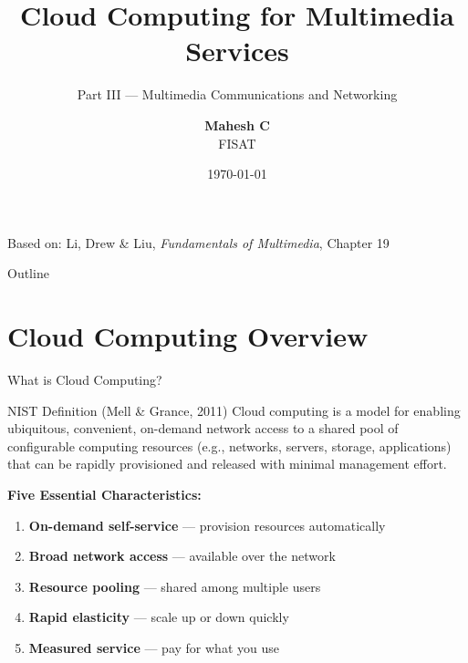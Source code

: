 \documentclass[aspectratio=169,12pt]{beamer}
\title[Cloud Computing for Multimedia]{Cloud Computing for Multimedia Services}
\subtitle{Part III --- Multimedia Communications and Networking}
\author[Mahesh C]{\textbf{Mahesh C}\\FISAT}
\institute{Federal Institute of Science and Technology (FISAT)\\Multimedia Technology Class}
\date{\today}
\begin{document}
\begin{frame}
    \titlepage
    \begin{center}
        \small Based on: Li, Drew \& Liu, \textit{Fundamentals of Multimedia}, Chapter 19
    \end{center}
\end{frame}

\begin{frame}{Outline}
    \tableofcontents
\end{frame}


\section{Cloud Computing Overview}

\begin{frame}{What is Cloud Computing?}
    \begin{block}{NIST Definition (Mell \& Grance, 2011)}
        Cloud computing is a model for enabling ubiquitous, convenient, on-demand network access to a shared pool of configurable computing resources (e.g., networks, servers, storage, applications) that can be rapidly provisioned and released with minimal management effort.
    \end{block}
    
    \vspace{0.3cm}
    \textbf{Five Essential Characteristics:}
    \begin{enumerate}
        \item \textbf{On-demand self-service} --- provision resources automatically
        \item \textbf{Broad network access} --- available over the network
        \item \textbf{Resource pooling} --- shared among multiple users
        \item \textbf{Rapid elasticity} --- scale up or down quickly
        \item \textbf{Measured service} --- pay for what you use
    \end{enumerate}
\end{frame}
\end{document}
